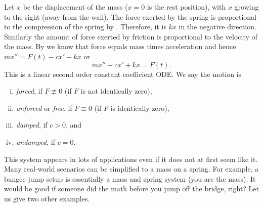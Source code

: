 Let $x$ be the displacement of the mass ($x=0$ is the rest position), with
$x$ growing to the right (away from the wall).
The force exerted by the spring is proportional to the
compression of the spring by .
Therefore, it is $kx$ in the negative direction.
Similarly the amount of force exerted by friction is proportional
to the velocity of the mass.
By  we know that force equals mass times acceleration
and hence $mx'' = F(t)-cx'-kx$ or
\begin{equation*}
mx'' + cx' + kx = F(t) .
\end{equation*}
This is a linear second order constant coefficient ODE\@.
We say the motion is
\begin{enumerate}[(i)]
\item \emph{forced}, if $F \not\equiv 0$ (if $F$ is not identically zero),
\item \emph{unforced} or \emph{free}, if $F \equiv 0$ (if $F$ is identically zero),
\item \emph{damped}, if $c > 0$, and
\item \emph{undamped}, if $c = 0$.
\end{enumerate}

This system appears in lots of applications even if it does not at first
seem like it.  Many real-world scenarios can be simplified to
a mass on a spring.  For example, a bungee jump setup is essentially a mass
and spring system (you are the mass).  It would be good if someone did the math
before you jump off the bridge, right? Let us give two other examples.

\medskip


